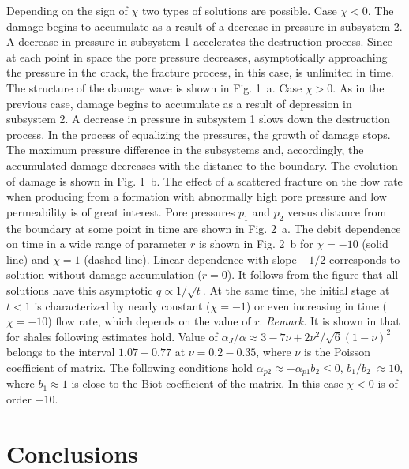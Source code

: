 \documentclass[article,authoryear,jpm]{beg_39}             %
\begin{document}
Depending on the sign of $\chi$ two types of solutions are possible.
Case $\chi<0$.
The damage begins to accumulate as a result of a decrease in pressure in subsystem 2.
A decrease in pressure in subsystem 1 accelerates the destruction process.
Since at each point in space the pore pressure decreases, asymptotically approaching the pressure in the crack, the fracture process, in this case, is unlimited in time.
The structure of the damage wave is shown in Fig. 1~a.
Case $\chi>0$.
As in the previous case, damage begins to accumulate as a result of depression in subsystem 2.
A decrease in pressure in subsystem 1 slows down the destruction process. In the process of equalizing the pressures, the growth of damage stops.
The maximum pressure difference in the subsystems and, accordingly, the accumulated damage decreases with the distance to the boundary.
The evolution of damage is shown in Fig. 1~b.
The effect of a scattered fracture on the flow rate when producing from a formation with abnormally high pore pressure and low permeability is of great interest.
Pore pressures $p_1$ and $p_2$ versus distance from the boundary at some point in time are shown in Fig. 2~a.
The debit dependence on time in a wide range of parameter $r$ is shown in Fig. 2~b for $\chi=-10$ (solid line) and $\chi=1$ (dashed line).
Linear dependence with slope $-1/2$ corresponds to solution without damage accumulation ($r=0$). It follows from the figure that all solutions have this asymptotic $q \propto 1/\sqrt{t}$. At the same time, the initial stage at $t < 1$ is characterized by nearly constant ($\chi=-1$) or even increasing in time ($\chi=-10$) flow rate, which depends on the value of $r$.
\textit{Remark.} It is shown in \cite{Izvekov2020} that for shales following estimates hold. Value of ${{{\alpha }_{J}}}/{\alpha }\approx {3-7\nu +2{{\nu }^{2}}}/{\sqrt{6}{{\left( 1-\nu  \right)}^{2}}}$ belongs to the interval $1.07 -0.77$ at $\nu =0.2-0.35$, where $\nu$ is the Poisson coefficient of matrix. The following conditions hold ${{\alpha }_{p2}}\approx -{{\alpha }_{p1}}{{b}_{2}}\le 0$, ${{{b}_{1}}}/{{{b}_{2}}}\;\approx 10$, where ${{b}_{1}}\approx 1$ is close to the Biot coefficient of the matrix. In this case $\chi <0$ is of order $-10$.

\section{Conclusions}
\end{document}
